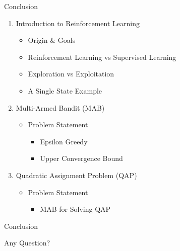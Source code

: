 \documentclass{beamer}
\begin{document}
\begin{frame}[t]{Conclusion} %
\begin{enumerate}
\item Introduction to Reinforcement Learning
		\begin{itemize}
		\item Origin \& Goals		
		\item Reinforcement Learning vs Supervised Learning		
		\item Exploration vs Exploitation		
		\item A Single State Example
		\end{itemize}		
\item Multi-Armed Bandit (MAB)
		\begin{itemize}		
		\item Problem Statement
			\begin{itemize}
			\item Epsilon Greedy		
			\item Upper Convergence Bound
			\end{itemize}
		\end{itemize}		
\item Quadratic Assignment Problem (QAP)
		\begin{itemize}
		\item Problem Statement		
			\begin{itemize}		
			\item MAB for Solving QAP			
			\end{itemize}
		\end{itemize}
\end{enumerate}
\end{frame}


\begin{frame}[t]{Conclusion} \vspace{30pt}
\Huge
\begin{center}
Any Question?
\end{center}
\end{frame}
\end{document}
